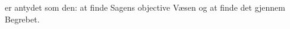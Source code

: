 \documentclass[12pt,a4paper]{book}
\newcommand{\gk}[1]{\textit{#1}}
\begin{document}
er antydet som den: at finde Sagens objective Væsen og at
finde det gjennem Begrebet.
\end{document}
